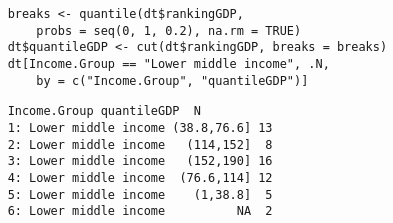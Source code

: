\documentclass[]{article}
\begin{document}

\begin{framed}
	\begin{verbatim}
	breaks <- quantile(dt$rankingGDP, 
	  	probs = seq(0, 1, 0.2), na.rm = TRUE)
	dt$quantileGDP <- cut(dt$rankingGDP, breaks = breaks)
	dt[Income.Group == "Lower middle income", .N, 
	   	by = c("Income.Group", "quantileGDP")]
	   		\end{verbatim}
\end{framed}
	   \begin{verbatim}	
	Income.Group quantileGDP  N
	1: Lower middle income (38.8,76.6] 13
	2: Lower middle income   (114,152]  8
	3: Lower middle income   (152,190] 16
	4: Lower middle income  (76.6,114] 12
	5: Lower middle income    (1,38.8]  5
	6: Lower middle income          NA  2
  \end{verbatim}
\end{document}
